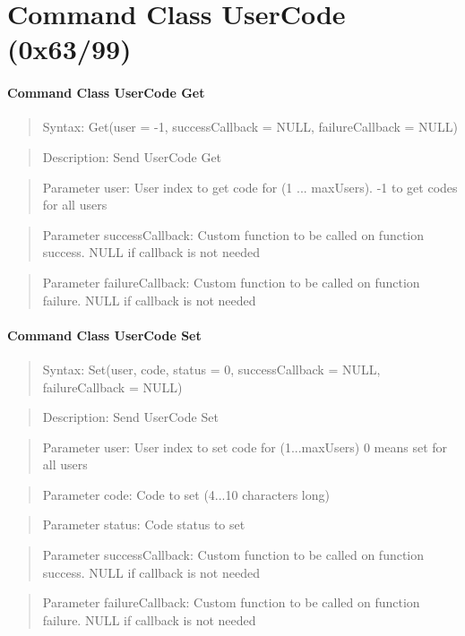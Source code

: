 \section{Command Class UserCode (0x63/99)}

\paragraph {Command Class UserCode Get}
\begin{quote} Syntax: Get(user = -1, successCallback = NULL, failureCallback = NULL)\end{quote}
\begin{quote} Description: Send UserCode Get\end{quote}
\begin{quote} Parameter user: User index to get code for (1 ... maxUsers). -1 to get codes for all users\end{quote}
\begin{quote} Parameter successCallback: Custom function to be called on function success. NULL if callback is not needed\end{quote}
\begin{quote} Parameter failureCallback: Custom function to be called on function failure. NULL if callback is not needed\end{quote}

\paragraph {Command Class UserCode Set}
\begin{quote} Syntax: Set(user, code, status = 0, successCallback = NULL, failureCallback = NULL)\end{quote}
\begin{quote} Description: Send UserCode Set\end{quote}
\begin{quote} Parameter user: User index to set code for (1...maxUsers) 0 means set for all users\end{quote}
\begin{quote} Parameter code: Code to set (4...10 characters long)\end{quote}
\begin{quote} Parameter status: Code status to set\end{quote}
\begin{quote} Parameter successCallback: Custom function to be called on function success. NULL if callback is not needed\end{quote}
\begin{quote} Parameter failureCallback: Custom function to be called on function failure. NULL if callback is not needed\end{quote}


